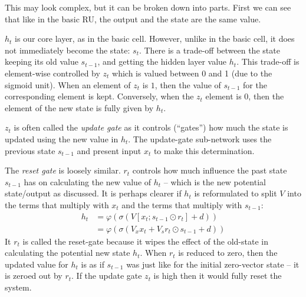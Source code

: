 \documentclass[12pt,parskip]{komatufte}
\begin{document}

This may look complex, but it can be broken down into parts.
First we can see that like in the basic RU, the output and the state are the same value.

$h_t$ is our core layer, as in the basic cell.
However, unlike in the basic cell, it does not immediately become the state: $s_t$.
There is a trade-off between the state keeping its old value $s_{t-1}$, and getting the hidden layer value $h_t$.
This trade-off is element-wise controlled by $z_t$ which is valued between 0 and 1 (due to the sigmoid unit).
When an element of $z_t$ is $1$, then the value of $s_{t-1}$ for the corresponding element is kept.
Conversely, when the $z_t$ element is $0$,  then the element of the new state is fully given by $h_t$.

$z_t$ is often called the \emph{update gate} as it controls (``gates'') how much the state is updated using the new value in $h_t$.
The update-gate sub-network uses the previous state $s_{t-1}$ and present input $x_t$ to make this determination.


The \emph{reset gate} is loosely similar.
$r_t$ controls how much influence the past state $s_{t-1}$ has on calculating the new value of $h_t$ -- which is the new potential state/output as discussed.
It is perhaps clearer if $h_t$ is reformulated to split $V$ into the terms that multiply with $x_t$ and the terms that multiply with $s_{t-1}$:
%
\begin{align}
h_t &= \varphi \left( \sigma \left( V[x_t; s_{t-1} \odot r_t] + d \right) \right) \\
&= \varphi \left( \sigma \left( V_x x_t + V_s r_t \odot s_{t-1} + d \right) \right)
\end{align}
%
It $r_t$ is called the reset-gate because it wipes the effect of the old-state in calculating the potential new state $h_t$.
When $r_t$ is reduced to zero, then the updated value for $h_t$ is as if $s_{t-1}$ was just like for the initial zero-vector state -- it is zeroed out by $r_t$.
If the update gate $z_t$ is high then it would fully reset the system.
\end{document}

